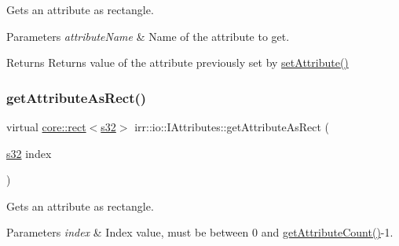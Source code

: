 Gets an attribute as rectangle. 


\begin{DoxyParams}{Parameters}
{\em attribute\+Name} & Name of the attribute to get. \\
\hline
\end{DoxyParams}
\begin{DoxyReturn}{Returns}
Returns value of the attribute previously set by \hyperlink{classirr_1_1io_1_1IAttributes_a03fa31acb481ae23678676cc183f09a6}{set\+Attribute()} 
\end{DoxyReturn}
\mbox{\label{classirr_1_1io_1_1IAttributes_af8efe18246d51e968da7d6380515dcd1}} 
\subsubsection{\texorpdfstring{get\+Attribute\+As\+Rect()}{getAttributeAsRect()}\hspace{0.1cm}{\footnotesize\ttfamily [2/2]}}
{\footnotesize\ttfamily virtual \hyperlink{classirr_1_1core_1_1rect}{core\+::rect}$<$\hyperlink{namespaceirr_ac66849b7a6ed16e30ebede579f9b47c6}{s32}$>$ irr\+::io\+::\+I\+Attributes\+::get\+Attribute\+As\+Rect (\begin{DoxyParamCaption}\item[{\hyperlink{namespaceirr_ac66849b7a6ed16e30ebede579f9b47c6}{s32}}]{index }\end{DoxyParamCaption})\hspace{0.3cm}{\ttfamily [pure virtual]}}



Gets an attribute as rectangle. 


\begin{DoxyParams}{Parameters}
{\em index} & Index value, must be between 0 and \hyperlink{classirr_1_1io_1_1IAttributes_a796bdd9440ee7ba0b6742a90a82870b6}{get\+Attribute\+Count()}-\/1. \\
\hline
\end{DoxyParams}
\mbox{\label{classirr_1_1io_1_1IAttributes_a60f395fd008a70cc0531fa038c81f0ea}} 
